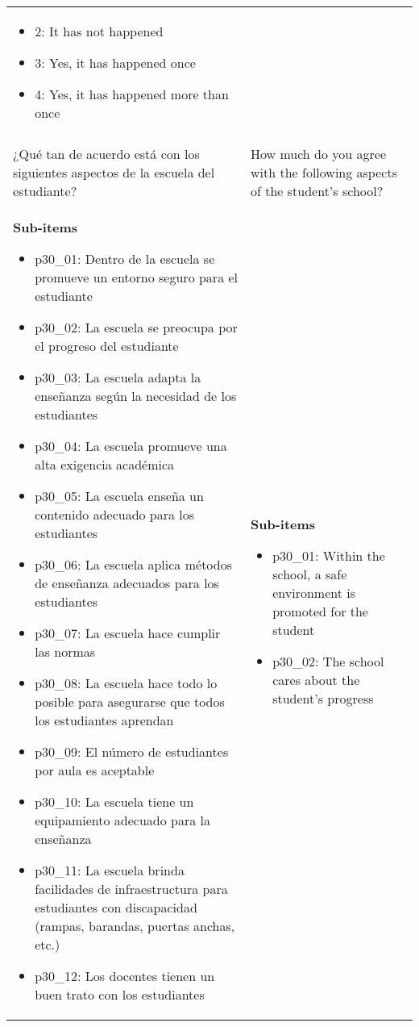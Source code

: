 \documentclass[11pt]{article}
\begin{document}
\begin{longtable}{@{}LL@{}}
\begin{itemize}[leftmargin=*]
\item 2: It has not happened
\item 3: Yes, it has happened once
\item 4: Yes, it has happened more than once\end{itemize} \\
\addlinespace[4pt]
 \\ 
¿Qué tan de acuerdo está con los siguientes aspectos de la escuela del estudiante? & How much do you agree with the following aspects of the student's school? \\
\textbf{Sub-items}\par\begin{itemize}[leftmargin=*]\item p30\_01: Dentro de la escuela se promueve un entorno seguro para el estudiante
\item p30\_02: La escuela se preocupa por el progreso del estudiante
\item p30\_03: La escuela adapta la enseñanza según la necesidad de los estudiantes
\item p30\_04: La escuela promueve una alta exigencia académica
\item p30\_05: La escuela enseña un contenido adecuado para los estudiantes
\item p30\_06: La escuela aplica métodos de enseñanza adecuados para los estudiantes
\item p30\_07: La escuela hace cumplir las normas
\item p30\_08: La escuela hace todo lo posible para asegurarse que todos los estudiantes aprendan
\item p30\_09: El número de estudiantes por aula es aceptable
\item p30\_10: La escuela tiene un equipamiento adecuado para la enseñanza
\item p30\_11: La escuela brinda facilidades de infraestructura para estudiantes con discapacidad (rampas, barandas, puertas anchas, etc.)
\item p30\_12: Los docentes tienen un buen trato con los estudiantes\end{itemize} & \textbf{Sub-items}\par\begin{itemize}[leftmargin=*]\item p30\_01: Within the school, a safe environment is promoted for the student
\item p30\_02: The school cares about the student's progress

\end{itemize}
\end{longtable}
\end{document}
